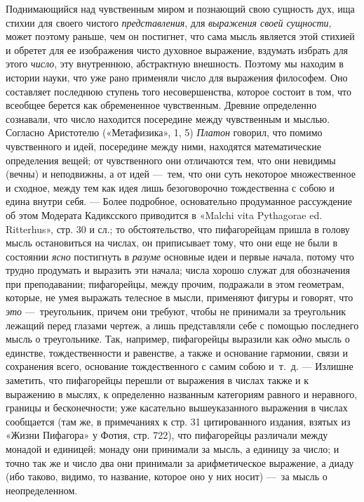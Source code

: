 {Поднимающийся над чувственным миром и познающий свою сущность дух, ища
стихии для своего чистого {\em представления}, для
{\em выражения своей сущности}, может поэтому раньше,
чем он постигнет, что сама мысль является этой стихией и обретет для ее
изображения чисто духовное выражение, вздумать избрать для этого
{\em число}, эту внутреннюю, абстрактную внешность.
Поэтому мы находим в истории науки, что уже рано применяли число для
выражения философем. Оно составляет последнюю ступень того несовершенства,
которое состоит в том, что всеобщее берется как обремененное чувственным.
Древние определенно сознавали, что число находится посередине между
чувственным и мыслью. Согласно Аристотелю («Метафизика», 1, 5)
{\em Платон} говорил, что помимо чувственного и идей,
посередине между ними, находятся математические определения вещей; от
чувственного они отличаются тем, что они невидимы (вечны) и неподвижны, а
от идей —~тем, что они суть некоторое множественное и сходное, между тем
как идея лишь безоговорочно тождественна с собою и едина внутри себя. —
Более подробное, основательно продуманное рассуждение об этом Модерата
Кадиксского приводится в «Malchi vita Pythagorae ed. Ritterhus», стр. 30 и
сл.; то обстоятельство, что пифагорейцам пришла в голову мысль остановиться
на числах, он приписывает тому, что они еще не были в состоянии
{\em ясно} постигнуть в
{\em разуме} основные идеи и первые начала, потому что
трудно продумать и выразить эти начала; числа хорошо служат для обозначения
при преподавании; пифагорейцы, между прочим, подражали в этом геометрам,
которые, не умея выражать телесное в мысли, применяют фигуры и говорят, что
{\em это} —~треугольник, причем они требуют, чтобы не
принимали за треугольник лежащий перед глазами чертеж, а лишь представляли
себе с помощью последнего мысль о треугольнике. Так, например, пифагорейцы
выразили как {\em одно} мысль о единстве,
тождественности и равенстве, а также и основание гармонии, связи и
сохранения всего, основание тождественного с самим собою и~т.~д. — Излишне
заметить, что пифагорейцы перешли от выражения в числах также и к выражению
в мыслях, к определенно названным категориям равного и неравного, границы и
бесконечности; уже касательно вышеуказанного выражения в числах сообщается
(там же, в примечаниях к стр. 31 цитированного издания, взятых из «Жизни
Пифагора» у Фотия, стр. 722), что пифагорейцы различали между монадой и
единицей; монаду они принимали за мысль, а единицу за число; и точно так же
и число два они принимали за арифметическое выражение, а диаду (ибо таково,
видимо, то название, которое оно у них носит) —~за мысль о неопределенном.
}
